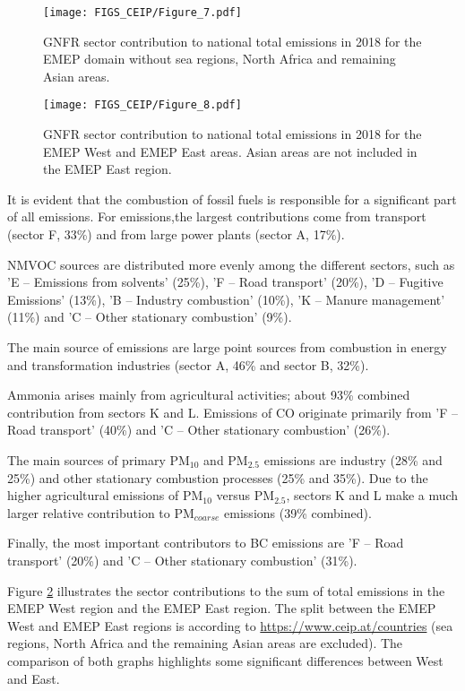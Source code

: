 \begin{figure}[h]
\centering
{\texttt{[image: FIGS\_CEIP/Figure\_7.pdf]}}
\caption{GNFR sector contribution to national total emissions in 2018
  for the EMEP domain without sea regions, North Africa and remaining Asian areas.}
\label{fig:CEIP7}
\end{figure}

\begin{figure}[h]
\centering
{\texttt{[image: FIGS\_CEIP/Figure\_8.pdf]}}
\caption{GNFR sector contribution to national total emissions in 2018
  for the EMEP West and EMEP East areas. Asian areas are not included in the EMEP East region.
}
\label{fig:CEIP8}
\end{figure}

It is evident that the combustion of fossil fuels is responsible for a significant part of all emissions. For \nox emissions,the largest contributions come from transport (sector F, 33\%) and from large power plants (sector A, 17\%).

NMVOC sources are distributed more evenly among the different sectors,
such as 'E -- Emissions from solvents' (25\%), 'F -- Road transport' (20\%), 'D -- Fugitive Emissions' (13\%), 'B -- Industry combustion' (10\%), 'K -- Manure management' (11\%) and 'C -- Other stationary combustion' (9\%).


The main source of  \sox emissions are large point sources from combustion in energy and transformation industries (sector A, 46\% and sector B, 32\%).

Ammonia arises mainly from agricultural activities; about 93\% combined contribution from sectors K and L. Emissions of CO  originate primarily from 'F -- Road transport' (40\%) and 'C -- Other stationary combustion'  (26\%). 

The main sources of primary PM$_{10}$ and PM$_{2.5}$ emissions  are industry (28\% and 25\%) and other stationary combustion processes (25\% and 35\%). Due to the higher agricultural emissions of PM$_{10}$ versus PM$_{2.5}$, sectors K and L make a much larger relative contribution to PM$_{coarse}$ emissions (39\% combined).

Finally, the most important contributors to BC emissions are 'F -- Road transport' (20\%) and 'C -- Other stationary combustion' (31\%).

Figure \ref{fig:CEIP8} illustrates the
sector contributions to the sum of total emissions in the EMEP West
region and the EMEP East region. The split between the EMEP West and EMEP East regions is according to  \url{ https://www.ceip.at/countries} (sea regions, North Africa and the remaining Asian areas are excluded). The comparison of both graphs highlights some significant differences between West and East. 

